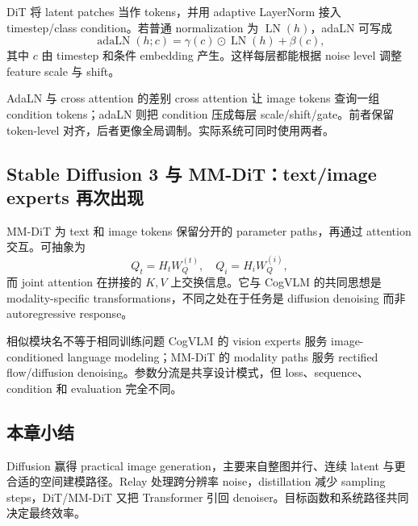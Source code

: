DiT 将 latent patches 当作 tokens，并用 adaptive LayerNorm 接入 timestep/class condition。若普通 normalization 为 $\operatorname{LN}(h)$，adaLN 可写成
\[
\operatorname{adaLN}(h;c)=\gamma(c)\odot\operatorname{LN}(h)+\beta(c),
\]
其中 $c$ 由 timestep 和条件 embedding 产生。这样每层都能根据 noise level 调整 feature scale 与 shift。


\begin{knowledgebox}{AdaLN 与 cross attention 的差别}
cross attention 让 image tokens 查询一组 condition tokens；adaLN 则把 condition 压成每层 scale/shift/gate。前者保留 token-level 对齐，后者更像全局调制。实际系统可同时使用两者。
\end{knowledgebox}


\subsection{Stable Diffusion 3 与 MM-DiT：text/image experts 再次出现}

MM-DiT 为 text 和 image tokens 保留分开的 parameter paths，再通过 attention 交互。可抽象为
\[
Q_t=H_tW_Q^{(t)},\quad Q_i=H_iW_Q^{(i)},
\]
而 joint attention 在拼接的 $K,V$ 上交换信息。它与 CogVLM 的共同思想是 modality-specific transformations，不同之处在于任务是 diffusion denoising 而非 autoregressive response。


\begin{warningbox}{相似模块名不等于相同训练问题}
CogVLM 的 vision experts 服务 image-conditioned language modeling；MM-DiT 的 modality paths 服务 rectified flow/diffusion denoising。参数分流是共享设计模式，但 loss、sequence、condition 和 evaluation 完全不同。
\end{warningbox}

\subsection{本章小结}

Diffusion 赢得 practical image generation，主要来自整图并行、连续 latent 与更合适的空间建模路径。Relay 处理跨分辨率 noise，distillation 减少 sampling steps，DiT/MM-DiT 又把 Transformer 引回 denoiser。目标函数和系统路径共同决定最终效率。

